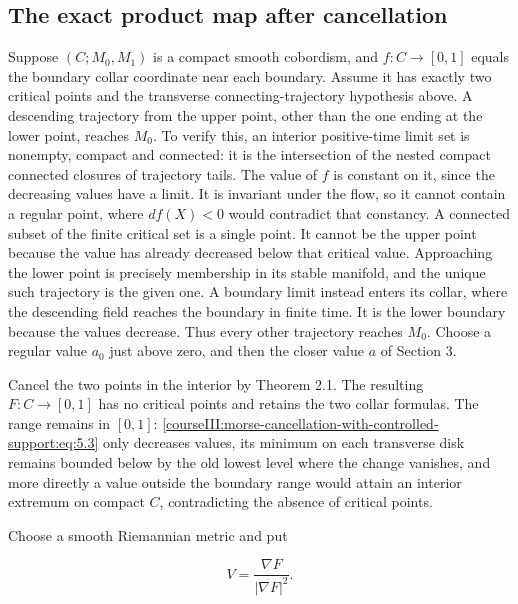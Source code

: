 \subsection{The exact product map after cancellation}
\label{courseIII:morse-cancellation-with-controlled-support:morse-product-map}

\label{courseIII:morse-cancellation-with-controlled-support:section-6}\label{courseIII:morse-cancel:6}

Suppose \((C;M_0,M_1)\) is a compact smooth cobordism, and \(f:C\to[0,1]\) equals the boundary collar coordinate near each boundary. Assume it has exactly two critical points and the transverse connecting-trajectory hypothesis above. A descending trajectory from the upper point, other than the one ending at the lower point, reaches \(M_0\). To verify this, an interior positive-time limit set is nonempty, compact and connected: it is the intersection of the nested compact connected closures of trajectory tails. The value of \(f\) is constant on it, since the decreasing values have a limit. It is invariant under the flow, so it cannot contain a regular point, where \(df(X)<0\) would contradict that constancy. A connected subset of the finite critical set is a single point. It cannot be the upper point because the value has already decreased below that critical value. Approaching the lower point is precisely membership in its stable manifold, and the unique such trajectory is the given one. A boundary limit instead enters its collar, where the descending field reaches the boundary in finite time. It is the lower boundary because the values decrease. Thus every other trajectory reaches \(M_0\). Choose a regular value \(a_0\) just above zero, and then the closer value \(a\) of Section 3.

Cancel the two points in the interior by Theorem 2.1. The resulting \(F:C\to[0,1]\) has no critical points and retains the two collar formulas. The range remains in \([0,1]\): \eqref{courseIII:morse-cancellation-with-controlled-support:eq:5.3} only decreases values, its minimum on each transverse disk remains bounded below by the old lowest level where the change vanishes, and more directly a value outside the boundary range would attain an interior extremum on compact \(C\), contradicting the absence of critical points.

Choose a smooth Riemannian metric and put

\begin{equation}
V=\frac{\nabla F}{|\nabla F|^2}.
\label{courseIII:morse-cancellation-with-controlled-support:eq:6.1}
\end{equation}

